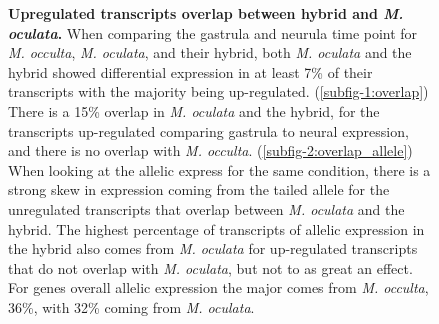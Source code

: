 \begin{figure}[!ht]
	\caption{\textbf{Upregulated transcripts overlap between hybrid and \textit{M. oculata}.} When comparing the gastrula and neurula time point for \textit{M. occulta}, \textit{M. oculata}, and their hybrid, both \textit{M. oculata} and the hybrid showed differential expression in at least 7\% of their transcripts with the majority being up-regulated. (\ref{subfig-1:overlap}) There is a 15\% overlap in \textit{M. oculata} and the hybrid, for the transcripts up-regulated comparing gastrula to neural expression, and there is no overlap with \textit{M. occulta}. (\ref{subfig-2:overlap_allele}) When looking at the allelic express for the same condition, there is a strong skew in expression coming from the tailed allele for the unregulated transcripts that overlap between \textit{M. oculata} and the hybrid. The highest percentage of transcripts of allelic expression in the hybrid also comes from \textit{M. oculata} for up-regulated transcripts that do not overlap with \textit{M. oculata}, but not to as great an effect.  For genes overall allelic expression the major comes from \textit{M. occulta}, 36\%, with 32\% coming from \textit{M. oculata}.}	
	\label{fig:upreg_tb}
\end{figure}

